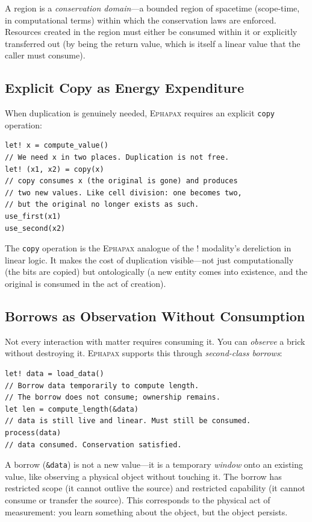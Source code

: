 \documentclass[11pt,a4paper]{article}
\newcommand{\ephapax}{\textsc{Ephapax}}
\newcommand{\bang}{!}
\begin{document}
A region is a \emph{conservation domain}---a bounded region of
spacetime (scope-time, in computational terms) within which the
conservation laws are enforced. Resources created in the region must
either be consumed within it or explicitly transferred out (by being
the return value, which is itself a linear value that the caller must
consume).

\subsection{Explicit Copy as Energy Expenditure}

When duplication is genuinely needed, \ephapax{} requires an explicit
\texttt{copy} operation:

\begin{lstlisting}
let! x = compute_value()
// We need x in two places. Duplication is not free.
let! (x1, x2) = copy(x)
// copy consumes x (the original is gone) and produces
// two new values. Like cell division: one becomes two,
// but the original no longer exists as such.
use_first(x1)
use_second(x2)
\end{lstlisting}

The \texttt{copy} operation is the \ephapax{} analogue of the
$\bang$ modality's dereliction in linear logic. It makes the
cost of duplication visible---not just computationally (the bits are
copied) but ontologically (a new entity comes into existence, and the
original is consumed in the act of creation).

\subsection{Borrows as Observation Without Consumption}

Not every interaction with matter requires consuming it. You can
\emph{observe} a brick without destroying it. \ephapax{} supports
this through \emph{second-class borrows}:

\begin{lstlisting}
let! data = load_data()
// Borrow data temporarily to compute length.
// The borrow does not consume; ownership remains.
let len = compute_length(&data)
// data is still live and linear. Must still be consumed.
process(data)
// data consumed. Conservation satisfied.
\end{lstlisting}

A borrow (\texttt{\&data}) is not a new value---it is a temporary
\emph{window} onto an existing value, like observing a physical
object without touching it. The borrow has restricted scope (it
cannot outlive the source) and restricted capability (it cannot
consume or transfer the source). This corresponds to the physical
act of measurement: you learn something about the object, but the
object persists.
\end{document}
